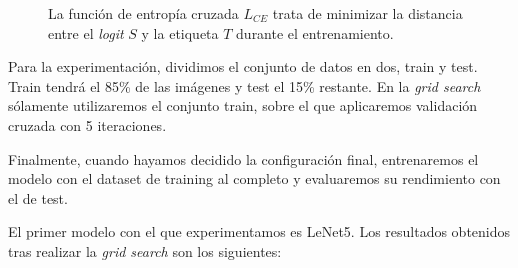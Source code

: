 \begin{figure}[H]
\centering
    \caption{La función de entropía cruzada $L_{CE}$ trata de minimizar la distancia entre el \textit{logit} $S$ y la etiqueta $T$ durante el entrenamiento. \cite{crossentropyloss}}
\end{figure}

Para la experimentación, dividimos el conjunto de datos en dos, train y test. Train tendrá el 85\% de las imágenes y test el 15\% restante. En la \textit{grid search} sólamente utilizaremos el conjunto train, sobre el que aplicaremos validación cruzada con 5 iteraciones. 

Finalmente, cuando hayamos decidido la configuración final, entrenaremos el modelo con el dataset de training al completo y evaluaremos su rendimiento con el de test.

El primer modelo con el que experimentamos es LeNet5. Los resultados obtenidos tras realizar la \textit{grid search} son los siguientes:

